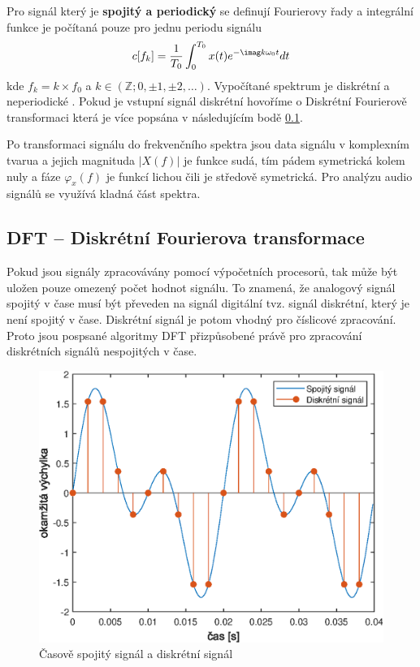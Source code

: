   Pro signál který je \textbf{spojitý a periodický} se definují Fourierovy řady a integrální funkce je počítaná pouze pro jednu periodu signálu
  \begin{equation}
    c[f_k] = \frac{1}{T_0} \int_{0}^{T_0} x(t) e^{-\imag k \omega_0 t} dt
  \end{equation}
  kde $f_k = k \times f_0$ a $k \in (\mathbb{Z}; 0, \pm 1, \pm 2, \dots)$. Vypočítané spektrum je diskrétní a neperiodické \cite{sneddon1995fourier}. Pokud je vstupní signál diskrétní hovoříme o Diskrétní Fourierově transformaci která je více popsána v následujícím bodě \ref{sec:DFT}.

 Po transformaci signálu do frekvenčního spektra jsou data signálu v komplexním tvarua a jejich magnituda $|X(f)|$ je funkce sudá, tím pádem symetrická kolem nuly a fáze $\varphi_x(f)$ je funkcí lichou čili je středově symetrická. Pro analýzu audio signálů se využívá kladná část spektra.

  \subsection{DFT -- Diskrétní Fourierova transformace} \label{sec:DFT}

  Pokud jsou signály zpracovávány pomocí výpočetních procesorů,
  tak může být uložen pouze omezený počet hodnot signálu.
  To znamená, že analogový signál spojitý v čase musí být převeden na signál digitální tvz. signál diskrétní, který je není spojitý v čase. 
  Diskrétní signál je potom vhodný pro číslicové zpracování.
  Proto jsou pospsané algoritmy \acs{DFT} přizpůsobené právě pro zpracování diskrétních signálů nespojitých v čase.

  \begin{figure}[H]
    \centering
    \includegraphics[width = 0.8\linewidth]{obrazky/Discrete_signal.eps}
    \caption{Časově spojitý signál a diskrétní signál}
    \label{fig:Discrete_signal}
  \end{figure}

